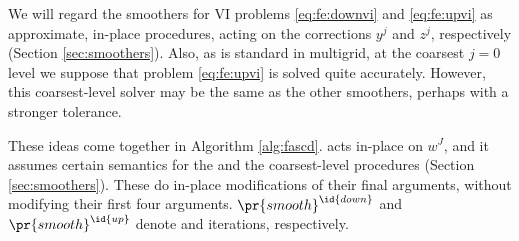 \documentclass[letterpaper,final,12pt,reqno]{amsart}
\theoremstyle{cstyle}
\theoremstyle{cstyle*}
\theoremstyle{dstyle}
\numberwithin{equation}{section}
\numberwithin{figure}{section}
\numberwithin{table}{section}
\numberwithin{theorem}{section}
\begin{document}
We will regard the smoothers for VI problems \eqref{eq:fe:downvi} and \eqref{eq:fe:upvi} as approximate, in-place procedures, acting on the corrections $y^j$ and $z^j$, respectively (Section \ref{sec:smoothers}).  Also, as is standard in multigrid, at the coarsest $j=0$ level we suppose that problem \eqref{eq:fe:upvi} is solved quite accurately.  However, this coarsest-level solver may be the same as the other smoothers, perhaps with a stronger tolerance.

These ideas come together in Algorithm \ref{alg:fascd}.   acts in-place on $w^J$, and it assumes certain semantics for the  and the coarsest-level  procedures (Section \ref{sec:smoothers}).  These do in-place modifications of their final arguments, without modifying their first four arguments.  $\pr{smooth}^{\id{down}}$ and $\pr{smooth}^{\id{up}}$ denote  and  iterations, respectively.
\end{document}
